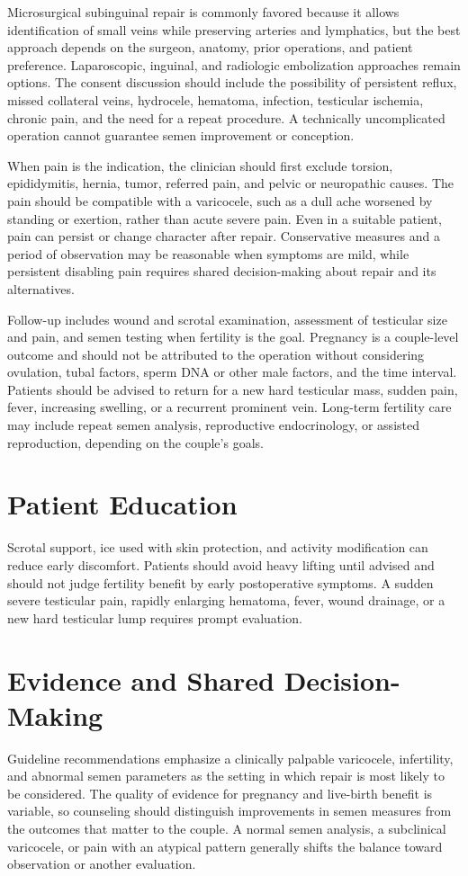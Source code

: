 Microsurgical subinguinal repair is commonly favored because it allows identification of small veins while preserving arteries and lymphatics, but the best approach depends on the surgeon, anatomy, prior operations, and patient preference. Laparoscopic, inguinal, and radiologic embolization approaches remain options. The consent discussion should include the possibility of persistent reflux, missed collateral veins, hydrocele, hematoma, infection, testicular ischemia, chronic pain, and the need for a repeat procedure. A technically uncomplicated operation cannot guarantee semen improvement or conception.

When pain is the indication, the clinician should first exclude torsion, epididymitis, hernia, tumor, referred pain, and pelvic or neuropathic causes. The pain should be compatible with a varicocele, such as a dull ache worsened by standing or exertion, rather than acute severe pain. Even in a suitable patient, pain can persist or change character after repair. Conservative measures and a period of observation may be reasonable when symptoms are mild, while persistent disabling pain requires shared decision-making about repair and its alternatives.

Follow-up includes wound and scrotal examination, assessment of testicular size and pain, and semen testing when fertility is the goal. Pregnancy is a couple-level outcome and should not be attributed to the operation without considering ovulation, tubal factors, sperm DNA or other male factors, and the time interval. Patients should be advised to return for a new hard testicular mass, sudden pain, fever, increasing swelling, or a recurrent prominent vein. Long-term fertility care may include repeat semen analysis, reproductive endocrinology, or assisted reproduction, depending on the couple's goals.

\section*{Patient Education}
Scrotal support, ice used with skin protection, and activity modification can reduce early discomfort. Patients should avoid heavy lifting until advised and should not judge fertility benefit by early postoperative symptoms. A sudden severe testicular pain, rapidly enlarging hematoma, fever, wound drainage, or a new hard testicular lump requires prompt evaluation.

\section*{Evidence and Shared Decision-Making}
Guideline recommendations emphasize a clinically palpable varicocele, infertility, and abnormal semen parameters as the setting in which repair is most likely to be considered. The quality of evidence for pregnancy and live-birth benefit is variable, so counseling should distinguish improvements in semen measures from the outcomes that matter to the couple. A normal semen analysis, a subclinical varicocele, or pain with an atypical pattern generally shifts the balance toward observation or another evaluation.

